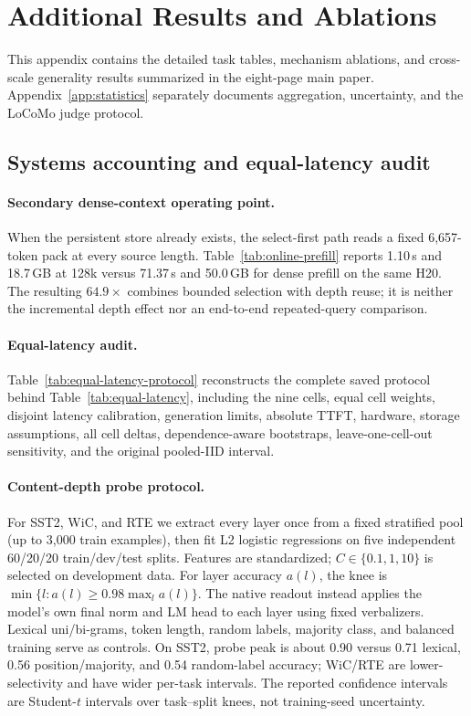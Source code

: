 \section{Additional Results and Ablations}
\label{sec:appendix}

This appendix contains the detailed task tables, mechanism ablations, and
cross-scale generality results summarized in the eight-page main paper.
Appendix~\ref{app:statistics} separately documents aggregation, uncertainty,
and the LoCoMo judge protocol.

\subsection{Systems accounting and equal-latency audit}
\label{app:systems}

\paragraph{Secondary dense-context operating point.}
When the persistent store already exists, the select-first path reads a fixed
6,657-token pack at every source length. Table~\ref{tab:online-prefill} reports
1.10\,s and 18.7\,GB at 128k versus 71.37\,s and 50.0\,GB for dense prefill on
the same H20. The resulting $64.9\times$ combines bounded selection with depth
reuse; it is neither the incremental depth effect nor an end-to-end
repeated-query comparison.


\FloatBarrier

\paragraph{Equal-latency audit.}
Table~\ref{tab:equal-latency-protocol} reconstructs the complete saved protocol
behind Table~\ref{tab:equal-latency}, including the nine cells, equal cell
weights, disjoint latency calibration, generation limits, absolute TTFT,
hardware, storage assumptions, all cell deltas, dependence-aware bootstraps,
leave-one-cell-out sensitivity, and the original pooled-IID interval.



\paragraph{Content-depth probe protocol.}
For SST2, WiC, and RTE we extract every layer once from a fixed stratified pool
(up to 3,000 train examples), then fit L2 logistic regressions on five independent
60/20/20 train/dev/test splits. Features are standardized; $C\in\{0.1,1,10\}$
is selected on development data. For layer accuracy $a(l)$, the knee is
$\min\{l:a(l)\geq0.98\max_l a(l)\}$. The native readout instead applies the
model's own final norm and LM head to each layer using fixed verbalizers. Lexical
uni/bi-grams, token length, random labels, majority class, and balanced training
serve as controls. On SST2, probe peak is about 0.90 versus 0.71 lexical, 0.56
position/majority, and 0.54 random-label accuracy; WiC/RTE are lower-selectivity
and have wider per-task intervals. The reported confidence intervals are
Student-$t$ intervals over task--split knees, not training-seed uncertainty.

